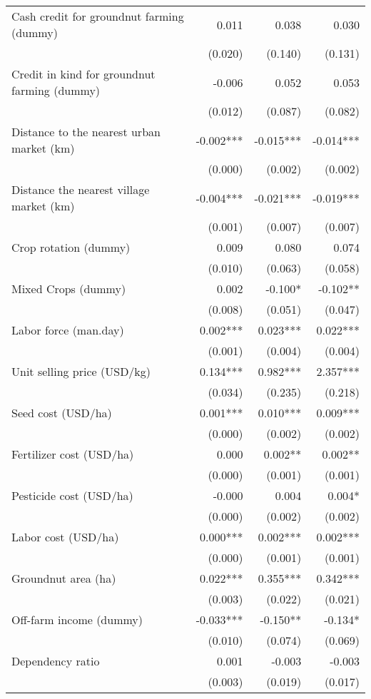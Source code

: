 \documentclass[
]{article}
\begin{document}
\begin{longtable}[t]{lrrr}
\addlinespace
Cash credit for groundnut farming (dummy) & 0.011 & 0.038 & 0.030\\
 & (0.020) & (0.140) & (0.131)\\
Credit in kind for groundnut farming (dummy) & -0.006 & 0.052 & 0.053\\
 & (0.012) & (0.087) & (0.082)\\
Distance to the nearest urban market (km) & -0.002*** & -0.015*** & -0.014***\\
\addlinespace
 & (0.000) & (0.002) & (0.002)\\
Distance the nearest village market (km) & -0.004*** & -0.021*** & -0.019***\\
 & (0.001) & (0.007) & (0.007)\\
Crop rotation (dummy) & 0.009 & 0.080 & 0.074\\
 & (0.010) & (0.063) & (0.058)\\
\addlinespace
Mixed Crops (dummy) & 0.002 & -0.100* & -0.102**\\
 & (0.008) & (0.051) & (0.047)\\
Labor force (man.day) & 0.002*** & 0.023*** & 0.022***\\
 & (0.001) & (0.004) & (0.004)\\
Unit selling price (USD/kg) & 0.134*** & 0.982*** & 2.357***\\
\addlinespace
 & (0.034) & (0.235) & (0.218)\\
Seed cost (USD/ha) & 0.001*** & 0.010*** & 0.009***\\
 & (0.000) & (0.002) & (0.002)\\
Fertilizer cost (USD/ha) & 0.000 & 0.002** & 0.002**\\
 & (0.000) & (0.001) & (0.001)\\
\addlinespace
Pesticide cost (USD/ha) & -0.000 & 0.004 & 0.004*\\
 & (0.000) & (0.002) & (0.002)\\
Labor cost (USD/ha) & 0.000*** & 0.002*** & 0.002***\\
 & (0.000) & (0.001) & (0.001)\\
Groundnut area (ha) & 0.022*** & 0.355*** & 0.342***\\
\addlinespace
 & (0.003) & (0.022) & (0.021)\\
Off-farm income (dummy) & -0.033*** & -0.150** & -0.134*\\
 & (0.010) & (0.074) & (0.069)\\
Dependency ratio & 0.001 & -0.003 & -0.003\\
 & (0.003) & (0.019) & (0.017)\\

\end{longtable}
\end{document}
